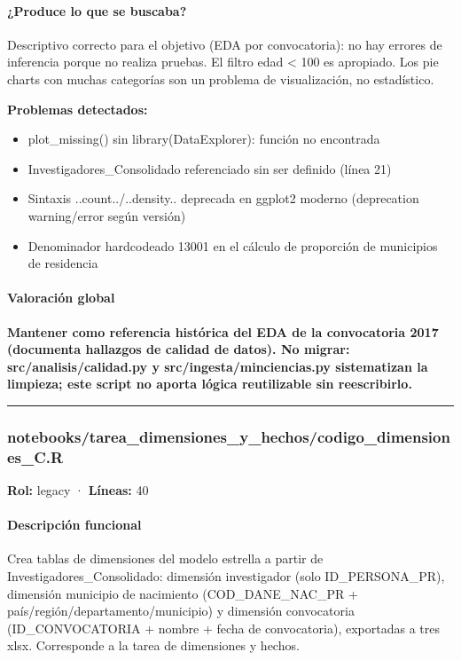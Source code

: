 \paragraph{¿Produce lo que se buscaba?}
Descriptivo correcto para el objetivo (EDA por convocatoria): no hay errores de inferencia porque no realiza pruebas. El filtro edad < 100 es apropiado. Los pie charts con muchas categorías son un problema de visualización, no estadístico.

\begin{tcolorbox}[riesgo]
\textbf{Problemas detectados:}
\begin{itemize}
  \item plot\_missing() sin library(DataExplorer): función no encontrada
  \item Investigadores\_Consolidado referenciado sin ser definido (línea 21)
  \item Sintaxis ..count../..density.. deprecada en ggplot2 moderno (deprecation warning/error según versión)
  \item Denominador hardcodeado 13001 en el cálculo de proporción de municipios de residencia
\end{itemize}
\end{tcolorbox}

\paragraph{Valoración global}
\textbf{Mantener como referencia histórica del EDA de la convocatoria 2017 (documenta hallazgos de calidad de datos). No migrar: src/analisis/calidad.py y src/ingesta/minciencias.py sistematizan la limpieza; este script no aporta lógica reutilizable sin reescribirlo.}

\medskip
\hrule

\subsubsection{notebooks/tarea\_dimensiones\_y\_hechos/codigo\_dimensiones\_C.R}
\textbf{Rol:} legacy · \textbf{Líneas:} 40

\paragraph{Descripción funcional}
Crea tablas de dimensiones del modelo estrella a partir de Investigadores\_Consolidado: dimensión investigador (solo ID\_PERSONA\_PR), dimensión municipio de nacimiento (COD\_DANE\_NAC\_PR + país/región/departamento/municipio) y dimensión convocatoria (ID\_CONVOCATORIA + nombre + fecha de convocatoria), exportadas a tres xlsx. Corresponde a la tarea de dimensiones y hechos.

